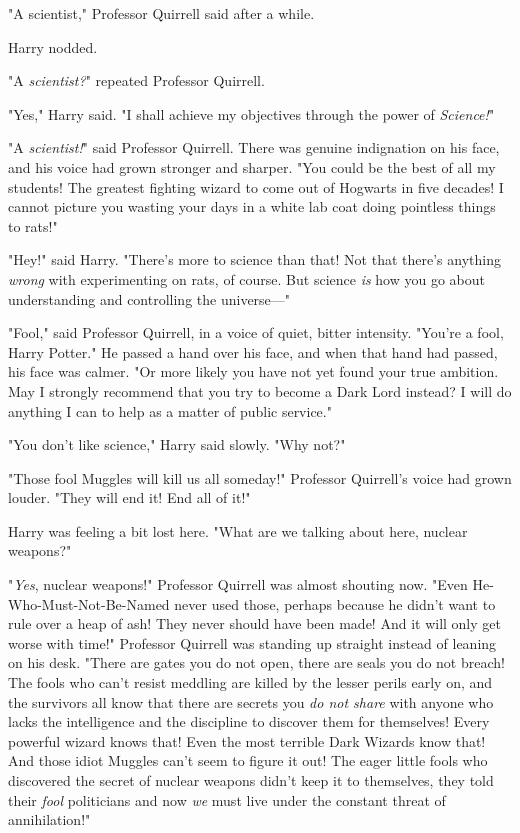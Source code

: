 "A scientist," Professor Quirrell said after a while.

Harry nodded.

"A \emph{scientist?}" repeated Professor Quirrell.

"Yes," Harry said. "I shall achieve my objectives through the power{\el} of
\emph{Science!}"

"A \emph{scientist!}" said Professor Quirrell. There was genuine indignation on
his face, and his voice had grown stronger and sharper. "You could be the best
of all my students! The greatest fighting wizard to come out of Hogwarts in
five decades! I cannot picture you wasting your days in a white lab coat doing
pointless things to rats!"

"Hey!" said Harry. "There's more to science than that! Not that there's
anything \emph{wrong} with experimenting on rats, of course. But science
\emph{is} how you go about understanding and controlling the universe—"

"Fool," said Professor Quirrell, in a voice of quiet, bitter intensity. "You're
a fool, Harry Potter." He passed a hand over his face, and when that hand had
passed, his face was calmer. "Or more likely you have not yet found your true
ambition. May I strongly recommend that you try to become a Dark Lord instead?
I will do anything I can to help as a matter of public service."

"You don't like science," Harry said slowly. "Why not?"

"Those fool Muggles will kill us all someday!" Professor Quirrell's voice had
grown louder. "They will end it! End all of it!"

Harry was feeling a bit lost here. "What are we talking about here, nuclear
weapons?"

"\emph{Yes}, nuclear weapons!" Professor Quirrell was almost shouting now.
"Even He-Who-Must-Not-Be-Named never used those, perhaps because he didn't want
to rule over a heap of ash! They never should have been made! And it will only
get worse with time!" Professor Quirrell was standing up straight instead of
leaning on his desk. "There are gates you do not open, there are seals you do
not breach! The fools who can't resist meddling are killed by the lesser perils
early on, and the survivors all know that there are secrets you \emph{do not
share} with anyone who lacks the intelligence and the discipline to discover
them for themselves! Every powerful wizard knows that! Even the most terrible
Dark Wizards know that! And those idiot Muggles can't seem to figure it out!
The eager little fools who discovered the secret of nuclear weapons didn't keep
it to themselves, they told their \emph{fool} politicians and now \emph{we}
must live under the constant threat of annihilation!"

